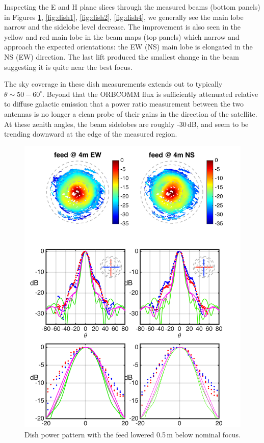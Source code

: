 \documentclass[preprint]{aastex}
\begin{document}
Inspecting the E and H plane slices through the measured beams (bottom panels) in Figures \ref{fig:dish3}, \ref{fig:dish1}, \ref{fig:dish2}, \ref{fig:dish4}, we generally see the main lobe narrow and the sidelobe level decrease. The improvement is also seen in the yellow and red main lobe in the beam maps (top panels) which narrow and approach the expected orientations: the EW (NS) main lobe is elongated in the NS (EW) direction. The last lift produced the smallest change in the beam suggesting it is quite near the best focus. 

The sky coverage in these dish measurements extends out to typically $\theta\sim50-60^\circ$. Beyond that the ORBCOMM flux is sufficiently attenuated relative to diffuse galactic emission that a power ratio measurement between the two antennas is no longer a clean probe of their gains in the direction of the satellite. At these zenith angles, the beam sidelobes are roughly -30\,dB, and seem to be trending downward at the edge of the measured region.

\begin{figure}[h]
\includegraphics[width=6.5in]{dish3_abs_old_ref_model.png}
\caption{Dish power pattern with the feed lowered 0.5\,m below nominal focus.}
\label{fig:dish3}
\end{figure}
\end{document}
